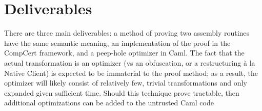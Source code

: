 \documentclass{exam}
\begin{document}
\section{Deliverables}
There are three main deliverables: a method of proving two assembly
routines have the same semantic meaning, an implementation of the
proof in the CompCert framework, and a peep-hole optimizer in Caml.
The fact that the actual transformation is an optimizer (vs an
obfuscation, or a restructuring \`a la Native Client) is expected to
be immaterial to the proof method; as a result, the optimizer will
likely consist of relatively few, trivial transformations and only
expanded given sufficient time. Should this technique prove tractable,
then additional optimizations can be added to the untrusted Caml code

{}

\end{document}
